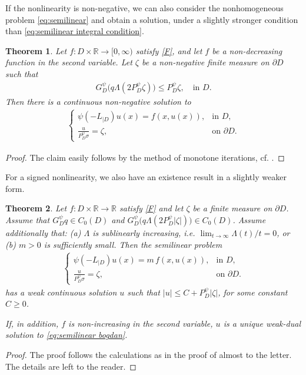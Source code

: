 \documentclass[12pt,a4paper,onecolumn]{article}
\newtheorem{thm}{Theorem}[section]
\theoremstyle{definition}
\newcommand{\R}{\mathbb{R}}
\newcommand{\1}{\mathbf 1}
\newcommand{\Lo}{\psi(-L_{|D})}
\newcommand{\GDP}{G_D^\psi}
\newcommand{\PDS}{P^{\psi}_{ D}}
\numberwithin{equation}{section}
\begin{document}
	
	If the nonlinearity is non-negative, we can also consider the nonhomogeneous problem \eqref{eq:semilinear} and obtain a solution, under a slightly stronger condition than \eqref{eq:semilinear integral condition}.

 \begin{thm}\label{t:semilin non-negative monotone linearity}
		Let $f:D\times \R\to[0,\infty)$ satisfy \ref{F}, and let $f$ be a non-decreasing function in the second variable. Let $\zeta$ be a non-negative finite measure on $\partial D$ such that
		\begin{align*}
			\GDP\big(q\Lambda(2\PDS\zeta)\big)\le \PDS\zeta,\quad \text{in $D$.}
		\end{align*}
		 Then  there is a continuous non-negative solution to
		\begin{align*}
			\begin{cases}
				\Lo u(x)=f(x,u(x)),&\textrm{in $D$},\\
				\frac{u}{\PDS\sigma}=\zeta,&\textrm{on $\partial D$}.
			\end{cases}
		\end{align*}
	\end{thm}
	
	\begin{proof}
		The claim easily follows  by the method of monotone iterations, cf. \cite[Theorem 5.14]{Bio23cpaa}.
	\end{proof}

	
	For a signed nonlinearity, we also have an existence result in a slightly weaker form.
 	\begin{thm}\label{t:semilinear signed data}
		Let $f:D\times \R\to \R$ satisfy \ref{F} and let $\zeta$ be a finite measure on $\partial D$. Assume that $\GDP q\in C_0(D)$ and $\GDP\big(q\Lambda(2\PDS|\zeta|)\big)\in C_0(D)$. Assume additionally that: (a) $\Lambda$ is sublinearly increasing, i.e. $\lim_{t\to\infty}\Lambda(t)/t=0$, or  (b) $m>0$ is sufficiently small. Then the semilinear problem
		\begin{align}\label{eq:semilinear bogdan}
			\begin{cases}
				\Lo u(x)=m\,f(x,u(x)),&\textrm{in $D$},\\
				\frac{u}{\PDS\sigma}=\zeta,&\textrm{on $\partial D$}.
			\end{cases}
		\end{align}
		has a weak continuous solution $u$ such that $|u|\le C+\PDS|\zeta|$, for some constant $C\ge0$.
		
		If, in addition, $f$ is non-increasing in the second variable, $u$ is a unique weak-dual solution to \eqref{eq:semilinear bogdan}.
	\end{thm}
	\begin{proof}
		The proof follows the calculations as in the proof of \cite[Theorem 5.16]{Bio23cpaa} almost to the letter. The details are left to the reader.
	\end{proof}
    
\end{document}
